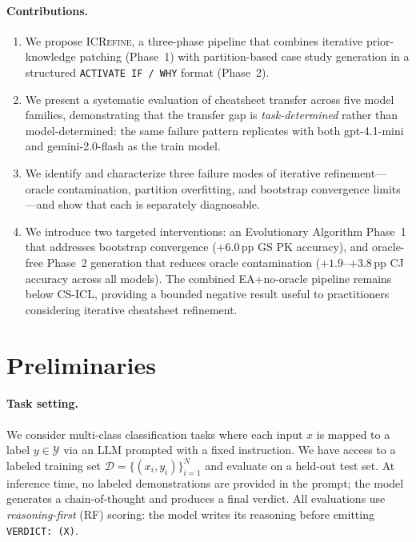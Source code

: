 \paragraph{Contributions.}
\begin{enumerate}[noitemsep,topsep=2pt]
  \item We propose \textsc{ICRefine}, a three-phase pipeline that combines iterative
        prior-knowledge patching (Phase~1) with partition-based case study generation in a
        structured \texttt{ACTIVATE~IF\,/\,WHY} format (Phase~2).
  \item We present a systematic evaluation of cheatsheet transfer across five model families,
        demonstrating that the transfer gap is \emph{task-determined} rather than
        model-determined: the same failure pattern replicates with both gpt-4.1-mini and
        gemini-2.0-flash as the train model.
  \item We identify and characterize three failure modes of iterative refinement---oracle
        contamination, partition overfitting, and bootstrap convergence limits---and show that
        each is separately diagnosable.
  \item We introduce two targeted interventions: an Evolutionary Algorithm Phase~1 that
        addresses bootstrap convergence ($+6.0$\,pp GS PK accuracy), and oracle-free Phase~2
        generation that reduces oracle contamination ($+1.9$--$+3.8$\,pp CJ accuracy across
        all models).
        The combined EA+no-oracle pipeline remains below CS-ICL, providing a bounded negative
        result useful to practitioners considering iterative cheatsheet refinement.
\end{enumerate}


\section{Preliminaries}
\label{sec:prelim}

\paragraph{Task setting.}
We consider multi-class classification tasks where each input $x$ is mapped to a label
$y \in \mathcal{Y}$ via an LLM prompted with a fixed instruction.
We have access to a labeled training set $\mathcal{D} = \{(x_i, y_i)\}_{i=1}^{N}$ and
evaluate on a held-out test set.
At inference time, no labeled demonstrations are provided in the prompt; the model
generates a chain-of-thought and produces a final verdict.
All evaluations use \emph{reasoning-first} (RF) scoring: the model writes its reasoning
before emitting \texttt{VERDICT:~(X)}.

